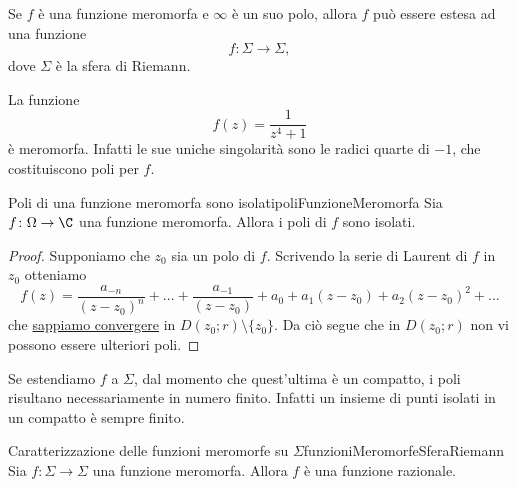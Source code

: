 \begin{oss}
	Se \(f\) è una funzione meromorfa e \(\infty\) è un suo polo, allora \(f\) può essere estesa ad una funzione
	\[
		f\colon \Sigma \to \Sigma,
	\]
	dove \(\Sigma\) è la sfera di Riemann.
\end{oss}

\begin{ese}
	La funzione
	\[
		f(z) = \frac{1}{z^4+1}
	\]
	è meromorfa.
	Infatti le sue uniche singolarità sono le radici quarte di \(-1\), che costituiscono poli per \(f\).
\end{ese}

\begin{prop}{Poli di una funzione meromorfa sono isolati}{poliFunzioneMeromorfa}
	Sia \(f\colon \Omega \to \C\) una funzione meromorfa.
	Allora i poli di \(f\) sono isolati.
\end{prop}

\begin{proof}
	Supponiamo che \(z_0\) sia un polo di \(f\). Scrivendo la serie di Laurent di \(f\) in \(z_0\) otteniamo
	\[
		f(z) = \frac{a_{-n}}{(z-z_0)^n}+\ldots+\frac{a_{-1}}{(z-z_0)} + a_0+a_1 (z-z_0)+a_2(z-z_0)^2+\ldots
	\]
	che \hyperref[oss:coronaMassimale]{sappiamo convergere} in \(D(z_0;r)\setminus\{z_0\}\).
	Da ciò segue che in \(D(z_0;r)\) non vi possono essere ulteriori poli.
\end{proof}

\begin{oss}
	Se estendiamo \(f\) a \(\Sigma\), dal momento che quest'ultima è un compatto, i poli risultano necessariamente in numero finito. Infatti un insieme di punti isolati in un compatto è sempre finito.
\end{oss}

\begin{prop}{Caratterizzazione delle funzioni meromorfe su \(\Sigma\)}{funzioniMeromorfeSferaRiemann}
	Sia \(f\colon \Sigma \to \Sigma\) una funzione meromorfa.
	Allora \(f\) è una funzione razionale.
\end{prop}

